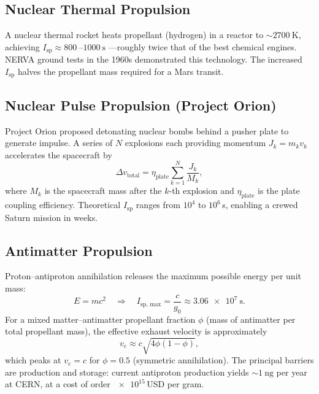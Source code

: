 \documentclass[12pt,a4paper]{article}
\begin{document}
\subsection{Nuclear Thermal Propulsion}

A nuclear thermal rocket heats propellant (hydrogen) in a reactor to
$\sim\SI{2700}{\kelvin}$, achieving $I_{\mathrm{sp}} \approx \SI{800}{}$--$\SI{1000}{\second}$
---roughly twice that of the best chemical engines. NERVA ground tests in the
1960s demonstrated this technology. The increased $I_{\mathrm{sp}}$ halves the
propellant mass required for a Mars transit.

\subsection{Nuclear Pulse Propulsion (Project Orion)}

Project Orion \citep{Dyson1968} proposed detonating nuclear bombs behind a
pusher plate to generate impulse. A series of $N$ explosions each providing
momentum $J_k = m_k v_k$ accelerates the spacecraft by
\begin{equation}
  \Delta v_{\mathrm{total}} = \eta_{\mathrm{plate}} \sum_{k=1}^N
    \frac{J_k}{M_k},
  \label{eq:orion}
\end{equation}
where $M_k$ is the spacecraft mass after the $k$-th explosion and
$\eta_{\mathrm{plate}}$ is the plate coupling efficiency. Theoretical
$I_{\mathrm{sp}}$ ranges from $10^4$ to $10^6$\,s, enabling a
crewed Saturn mission in weeks.

\subsection{Antimatter Propulsion}

Proton--antiproton annihilation releases the maximum possible energy per unit
mass:
\begin{equation}
  E = mc^2 \quad \Rightarrow \quad
  I_{\mathrm{sp,\,max}} = \frac{c}{g_0} \approx \SI{3.06e7}{\second}.
  \label{eq:antimatter_isp}
\end{equation}
For a mixed matter--antimatter propellant fraction $\phi$ (mass of
antimatter per total propellant mass), the effective exhaust velocity is
approximately
\begin{equation}
  v_e \approx c\sqrt{4\phi(1-\phi)},
  \label{eq:antimatter_ve}
\end{equation}
which peaks at $v_e = c$ for $\phi = 0.5$ (symmetric annihilation).
The principal barriers are production and storage: current antiproton
production yields $\sim \SI{1}{\nano\gram}$ per year at CERN, at a cost
of order $\num{e15}$\,USD per gram.
\end{document}
